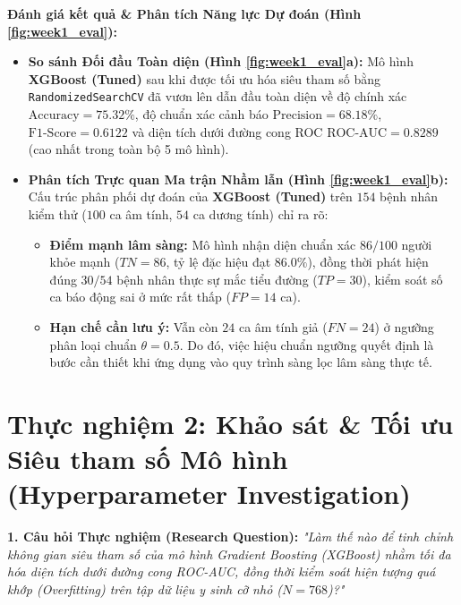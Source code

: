\documentclass[12pt,a4paper]{report}
\begin{document}
\textbf{Đánh giá kết quả \& Phân tích Năng lực Dự đoán (Hình \ref{fig:week1_eval}):}
\begin{itemize}[leftmargin=1.5em]
    \item \textbf{So sánh Đối đầu Toàn diện (Hình \ref{fig:week1_eval}a):} Mô hình \textbf{XGBoost (Tuned)} sau khi được tối ưu hóa siêu tham số bằng \texttt{RandomizedSearchCV} đã vươn lên dẫn đầu toàn diện về độ chính xác $\text{Accuracy} = \mathbf{75.32\%}$, độ chuẩn xác cảnh báo $\text{Precision} = \mathbf{68.18\%}$, $\text{F1-Score} = \mathbf{0.6122}$ và diện tích dưới đường cong ROC $\text{ROC-AUC} = \mathbf{0.8289}$ (cao nhất trong toàn bộ 5 mô hình).
    
    \item \textbf{Phân tích Trực quan Ma trận Nhầm lẫn (Hình \ref{fig:week1_eval}b):}
    Cấu trúc phân phối dự đoán của \textbf{XGBoost (Tuned)} trên $154$ bệnh nhân kiểm thử ($100$ ca âm tính, $54$ ca dương tính) chỉ ra rõ:
    \begin{itemize}[leftmargin=1.2em]
        \item \textbf{Điểm mạnh lâm sàng:} Mô hình nhận diện chuẩn xác $86/100$ người khỏe mạnh ($TN = 86$, tỷ lệ đặc hiệu đạt $86.0\%$), đồng thời phát hiện đúng $30/54$ bệnh nhân thực sự mắc tiểu đường ($TP = 30$), kiểm soát số ca báo động sai ở mức rất thấp ($FP = 14$ ca).
        \item \textbf{Hạn chế cần lưu ý:} Vẫn còn $24$ ca âm tính giả ($FN = 24$) ở ngưỡng phân loại chuẩn $\theta = 0.5$. Do đó, việc hiệu chuẩn ngưỡng quyết định là bước cần thiết khi ứng dụng vào quy trình sàng lọc lâm sàng thực tế.
    \end{itemize}
\end{itemize}

\section{Thực nghiệm 2: Khảo sát \& Tối ưu Siêu tham số Mô hình (Hyperparameter Investigation)}

\textbf{1. Câu hỏi Thực nghiệm (Research Question):}
\textit{"Làm thế nào để tinh chỉnh không gian siêu tham số của mô hình Gradient Boosting (XGBoost) nhằm tối đa hóa diện tích dưới đường cong ROC-AUC, đồng thời kiểm soát hiện tượng quá khớp (Overfitting) trên tập dữ liệu y sinh cỡ nhỏ ($N=768$)?"}
\end{document}
